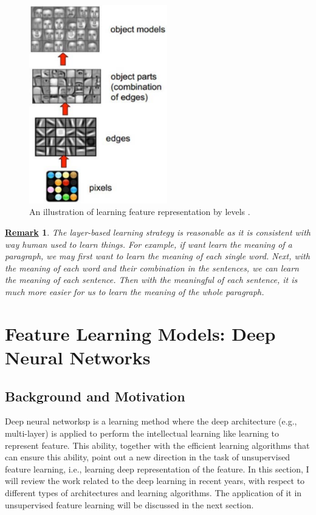 \documentclass[conference]{IEEEtran}
\newtheorem{remark}{\underline{Remark}}
\begin{document}
\begin{figure}[t]
\centering
\includegraphics[width=60mm]{feat_level.pdf}
\caption{An illustration of learning feature representation by levels \cite{face}.}
\label{fig:feat_level}
\end{figure}

\begin{remark}
The layer-based learning strategy is reasonable as it is consistent with way human used to learn things. For example, if want learn the meaning of a paragraph, we may first want to learn the meaning of each single word.
Next, with the meaning of each word and their combination in the sentences, we can learn the meaning of each sentence. Then with the meaningful of each sentence, it is much more easier for us to learn the meaning of the whole paragraph.
\end{remark}

\section{Feature Learning Models: Deep Neural Networks}

\subsection{Background and Motivation}

Deep neural networksp is a learning method where the deep architecture (e.g., multi-layer) is applied to perform the intellectual learning like learning to represent feature. This ability, together with the efficient learning algorithms that can ensure this ability, point out a new direction in the task of unsupervised feature learning, i.e., learning deep representation of the feature. In this section, I will review the work related to the deep learning in recent years, with respect to different types of architectures and learning algorithms. The application of it in unsupervised feature learning will be discussed in the next section.
\end{document}
